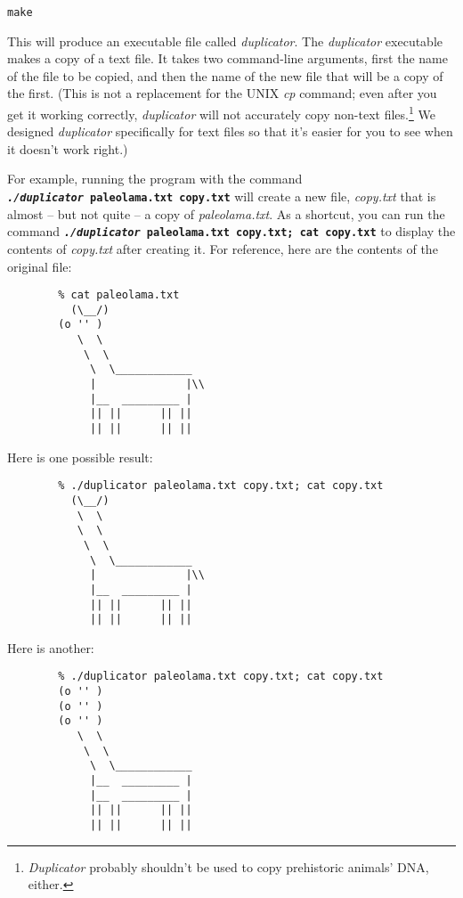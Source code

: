     \texttt{make}

    This will produce an executable file called \textit{duplicator}.
    The \textit{duplicator} executable makes a copy of a text file.
    It takes two command-line arguments, first the name of the file to be copied, and then the name of the new file that will be a copy of the first.
    (This is not a replacement for the UNIX \textit{cp} command;
    even after you get it working correctly, \textit{duplicator} will not accurately copy non-text files.\footnote{\textit{Duplicator} probably shouldn't be used to copy prehistoric animals' DNA, either.}
    We designed \textit{duplicator} specifically for text files so that it's easier for you to see when it doesn't work right.)

    For example, running the program with the command \texttt{\textbf{\textit{./duplicator}~paleolama.txt~copy.txt}} will create a new file, \textit{copy.txt} that is almost -- but not quite -- a copy of \textit{paleolama.txt}.
    As a shortcut, you can run the command \texttt{\textbf{\textit{./duplicator}~paleolama.txt~copy.txt;~cat~copy.txt}} to display the contents of \textit{copy.txt} after creating it.
    For reference, here are the contents of the original file:

    \begin{verbatim}
        % cat paleolama.txt
          (\__/)
        (o '' )
           \  \
            \  \
             \  \____________
             |              |\\
             |__  _________ |
             || ||      || ||
             || ||      || ||
    \end{verbatim}

    Here is one possible result:

    \begin{verbatim}
        % ./duplicator paleolama.txt copy.txt; cat copy.txt
          (\__/)
           \  \
           \  \
            \  \
             \  \____________
             |              |\\
             |__  _________ |
             || ||      || ||
             || ||      || ||
    \end{verbatim}

    Here is another:

    \begin{verbatim}
        % ./duplicator paleolama.txt copy.txt; cat copy.txt
        (o '' )
        (o '' )
        (o '' )
           \  \
            \  \
             \  \____________
             |__  _________ |
             |__  _________ |
             || ||      || ||
             || ||      || ||
    \end{verbatim}

